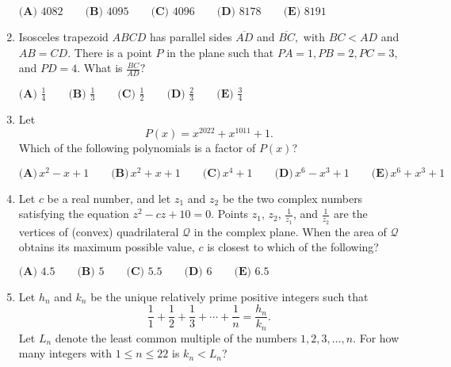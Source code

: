 \documentclass{article}
\begin{document}
\begin{enumerate}[label=\arabic*., itemsep=0.5em]
\(\textbf{(A) } 4082 \qquad \textbf{(B) } 4095 \qquad \textbf{(C) } 4096 \qquad \textbf{(D) } 8178 \qquad \textbf{(E) } 8191\)\par \vspace{0.5em}\item Isosceles trapezoid \(ABCD\) has parallel sides \(\overline{AD}\) and \(\overline{BC},\) with \(BC < AD\) and \(AB = CD.\) There is a point \(P\) in the plane such that \(PA=1, PB=2, PC=3,\) and \(PD=4.\) What is \(\tfrac{BC}{AD}?\)

\(\textbf{(A) }\frac{1}{4}\qquad\textbf{(B) }\frac{1}{3}\qquad\textbf{(C) }\frac{1}{2}\qquad\textbf{(D) }\frac{2}{3}\qquad\textbf{(E) }\frac{3}{4}\)\par \vspace{0.5em}\item Let 
\begin{equation*}
P(x) = x^{2022} + x^{1011} + 1.
\end{equation*}
 Which of the following polynomials is a factor of \(P(x)\)?

\(\textbf{(A)} \, x^2 -x + 1 \qquad\textbf{(B)} \, x^2 + x + 1 \qquad\textbf{(C)} \, x^4 + 1 \qquad\textbf{(D)} \, x^6 - x^3 + 1  \qquad\textbf{(E)} \, x^6 + x^3 + 1 \)\par \vspace{0.5em}\item Let \(c\) be a real number, and let \(z_1\) and \(z_2\) be the two complex numbers satisfying the equation
\(z^2 - cz + 10 = 0\). Points \(z_1\), \(z_2\), \(\frac{1}{z_1}\), and \(\frac{1}{z_2}\) are the vertices of (convex) quadrilateral \(\mathcal{Q}\) in the complex plane. When the area of \(\mathcal{Q}\) obtains its maximum possible value, \(c\) is closest to which of the following?

\(\textbf{(A) }4.5 \qquad\textbf{(B) }5 \qquad\textbf{(C) }5.5 \qquad\textbf{(D) }6\qquad\textbf{(E) }6.5\)\par \vspace{0.5em}\item Let \(h_n\) and \(k_n\) be the unique relatively prime positive integers such that 
\begin{equation*}
\frac{1}{1}+\frac{1}{2}+\frac{1}{3}+\cdots+\frac{1}{n}=\frac{h_n}{k_n}.
\end{equation*}
 Let \(L_n\) denote the least common multiple of the numbers \(1, 2, 3, \ldots, n\). For how many integers with \(1\le{n}\le{22}\) is \(k_n<L_n\)?


\end{enumerate}
\end{document}

